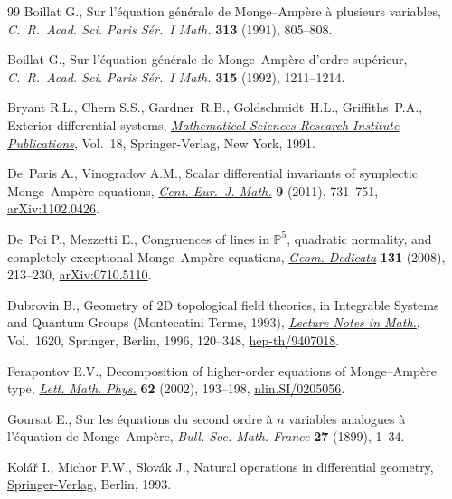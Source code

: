 \documentclass[10pt,a4paper]{amsart}
\numberwithin{equation}{section}
\begin{document}
\begin{thebibliography}{99}
Boillat G., Sur l'\'equation g\'en\'erale de {M}onge--{A}mp\`ere \`a plusieurs
 variables, \textit{C.~R.~Acad. Sci. Paris S\'er.~I Math.} \textbf{313}
 (1991), 805--808.

Boillat G., Sur l'\'equation g\'en\'erale de {M}onge--{A}mp\`ere d'ordre
 sup\'erieur, \textit{C.~R.~Acad. Sci. Paris S\'er.~I Math.} \textbf{315}
 (1992), 1211--1214.

Bryant R.L., Chern S.S., Gardner~R.B., Goldschmidt~H.L., Grif\/f\/iths~P.A.,
 Exterior dif\/ferential systems, \href{http://dx.doi.org/10.1007/978-1-4613-9714-4}{\textit{Mathematical Sciences Research
 Institute Publications}}, Vol.~18, Springer-Verlag, New York, 1991.

De~Paris A., Vinogradov A.M., Scalar dif\/ferential invariants of symplectic
 {M}onge--{A}mp\`ere equations, \href{http://dx.doi.org/10.2478/s11533-011-0046-7}{\textit{Cent. Eur.~J. Math.}} \textbf{9}
 (2011), 731--751, \href{http://arxiv.org/abs/1102.0426}{arXiv:1102.0426}.

De~Poi P., Mezzetti E., Congruences of lines in {${\mathbb P}^5$}, quadratic
 normality, and completely exceptional {M}onge--{A}mp\`ere equations,
 \href{http://dx.doi.org/10.1007/s10711-007-9228-7}{\textit{Geom. Dedicata}} \textbf{131} (2008), 213--230, \href{http://arxiv.org/abs/0710.5110}{arXiv:0710.5110}.

Dubrovin B., Geometry of {$2$}{D} topological f\/ield theories, in Integrable
 Systems and Quantum Groups ({M}ontecatini {T}erme, 1993), \href{http://dx.doi.org/10.1007/BFb0094793}{\textit{Lecture
 Notes in Math.}}, Vol.~1620, Springer, Berlin, 1996, 120--348,
 \href{http://arxiv.org/abs/hep-th/9407018}{hep-th/9407018}.

Ferapontov E.V., Decomposition of higher-order equations of {M}onge--{A}mp\`ere
 type, \href{http://dx.doi.org/10.1023/A:1022236709346}{\textit{Lett. Math. Phys.}} \textbf{62} (2002), 193--198,
 \href{http://arxiv.org/abs/nlin.SI/0205056}{nlin.SI/0205056}.

Goursat E., Sur les \'equations du second ordre \`a {$n$} variables analogues
 \`a l'\'equation de {M}onge--{A}mp\`ere, \textit{Bull. Soc. Math. France}
 \textbf{27} (1899), 1--34.

Kol{\'a}{\v{r}} I., Michor P.W., Slov{\'a}k J., Natural operations in
 dif\/ferential geometry, \href{http://dx.doi.org/10.1007/978-3-662-02950-3}{Springer-Verlag}, Berlin, 1993.


\end{thebibliography}
\end{document}
